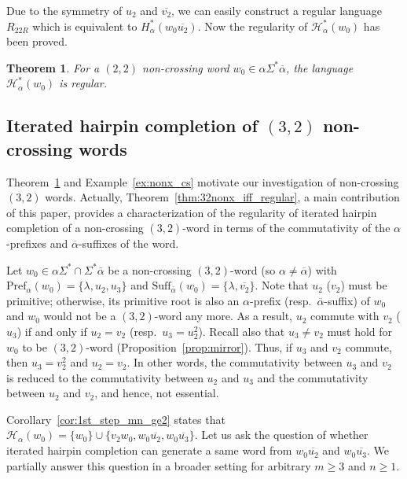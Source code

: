 \documentclass{article}
\theoremstyle{plain}
\newtheorem{theorem}{Theorem}
\theoremstyle{remark}
\newcommand{\HC}{\ensuremath{\mathcal{H}}}
\newcommand{\Pref}{\ensuremath{\mathrm{Pref}}}
\newcommand{\Suff}{\ensuremath{\mathrm{Suff}}}
\newcommand{\calpha}{\ensuremath{\overline{\alpha}}}
\begin{document}
Due to the symmetry of $u_2$ and $\overline{v_2}$, we can easily construct a regular language $R_{22R}$ which is equivalent to $H_\alpha^*(w_0 \overline{u_2})$. 
Now the regularity of $\HC_\alpha^*(w_0)$ has been proved. 


\begin{theorem}\label{thm:22nonx_regular}
	For a $(2, 2)$ non-crossing word $w_0 \in \alpha \Sigma^* \overline{\alpha}$, the language $\HC_\alpha^*(w_0)$ is regular. 
\end{theorem}


\subsection{Iterated hairpin completion of $(3, 2)$ non-crossing words}

Theorem~\ref{thm:22nonx_regular} and Example~\ref{ex:nonx_cs} motivate our investigation of non-crossing $(3, 2)$ words. 
Actually, Theorem~\ref{thm:32nonx_iff_regular}, a main contribution of this paper, provides a characterization of the regularity of iterated hairpin completion of a non-crossing $(3, 2)$-word in terms of the commutativity of the $\alpha$-prefixes and $\calpha$-suffixes of the word. 

Let $w_0 \in \alpha \Sigma^* \cap \Sigma^* \overline{\alpha}$ be a non-crossing $(3, 2)$-word (so $\alpha \neq \overline{\alpha}$) with $\Pref_\alpha(w_0) = \{\lambda, u_2, u_3\}$ and $\Suff_{\calpha}(w_0) = \{\lambda, \overline{v_2}\}$. 
Note that $u_2$ ($v_2$) must be primitive; otherwise, its primitive root is also an $\alpha$-prefix (resp.~$\calpha$-suffix) of $w_0$ and $w_0$ would not be a $(3, 2)$-word any more. 
As a result, $u_2$ commute with $v_2$ ($u_3$) if and only if $u_2 = v_2$ (resp.~$u_3 = u_2^2$). 
Recall also that $u_3 \neq v_2$ must hold for $w_0$ to be $(3, 2)$-word (Proposition~\ref{prop:mirror}).
Thus, if $u_3$ and $v_2$ commute, then $u_3 = v_2^2$ and $u_2 = v_2$. 
In other words, the commutativity between $u_3$ and $v_2$ is reduced to the commutativity between $u_2$ and $u_3$ and the commutativity between $u_2$ and $v_2$, and hence, not essential. 

Corollary~\ref{cor:1st_step_mn_ge2} states that $\HC_\alpha(w_0) = \{w_0\} \cup \{v_2 w_0, w_0 \overline{u_2}, w_0 \overline{u_3}\}$. 
Let us ask the question of whether iterated hairpin completion can generate a same word from $w_0 \overline{u_2}$ and $w_0 \overline{u_3}$. 
We partially answer this question in a broader setting for arbitrary $m \ge 3$ and $n \ge 1$. 
\end{document}

